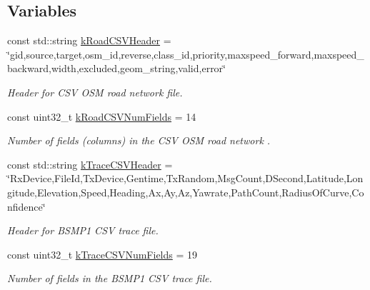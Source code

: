 \subsection*{Variables}
\begin{DoxyCompactItemize}
\item 
const std\+::string \hyperlink{namespacegeo__data_a969af86800f6c61411452280db2d47dc}{k\+Road\+C\+S\+V\+Header} = \char`\"{}gid,source,target,osm\+\_\+id,reverse,class\+\_\+id,priority,maxspeed\+\_\+forward,maxspeed\+\_\+backward,width,excluded,geom\+\_\+string,valid,error\char`\"{}\hypertarget{namespacegeo__data_a969af86800f6c61411452280db2d47dc}{}\label{namespacegeo__data_a969af86800f6c61411452280db2d47dc}

\begin{DoxyCompactList}\small\item\em Header for C\+SV O\+SM road network file. \end{DoxyCompactList}\item 
const uint32\+\_\+t \hyperlink{namespacegeo__data_a714ca3d923889110e62e69997dbbcb41}{k\+Road\+C\+S\+V\+Num\+Fields} = 14\hypertarget{namespacegeo__data_a714ca3d923889110e62e69997dbbcb41}{}\label{namespacegeo__data_a714ca3d923889110e62e69997dbbcb41}

\begin{DoxyCompactList}\small\item\em Number of fields (columns) in the C\+SV O\+SM road network . \end{DoxyCompactList}\item 
const std\+::string \hyperlink{namespacegeo__data_abe7f3abbcd66372e8490f8d5adea3787}{k\+Trace\+C\+S\+V\+Header} = \char`\"{}Rx\+Device,File\+Id,Tx\+Device,Gentime,Tx\+Random,Msg\+Count,D\+Second,Latitude,Longitude,Elevation,Speed,Heading,Ax,Ay,Az,Yawrate,Path\+Count,Radius\+Of\+Curve,Confidence\char`\"{}\hypertarget{namespacegeo__data_abe7f3abbcd66372e8490f8d5adea3787}{}\label{namespacegeo__data_abe7f3abbcd66372e8490f8d5adea3787}

\begin{DoxyCompactList}\small\item\em Header for B\+S\+M\+P1 C\+SV trace file. \end{DoxyCompactList}\item 
const uint32\+\_\+t \hyperlink{namespacegeo__data_a50a14f246f326d96bd1fd63479262885}{k\+Trace\+C\+S\+V\+Num\+Fields} = 19\hypertarget{namespacegeo__data_a50a14f246f326d96bd1fd63479262885}{}\label{namespacegeo__data_a50a14f246f326d96bd1fd63479262885}

\begin{DoxyCompactList}\small\item\em Number of fields in the B\+S\+M\+P1 C\+SV trace file. \end{DoxyCompactList}\end{DoxyCompactItemize}


